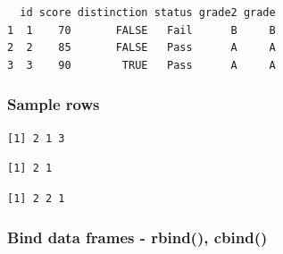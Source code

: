 \documentclass[
  letterpaper,
  DIV=11,
  numbers=noendperiod]{scrartcl}
\newenvironment{Shaded}{\begin{snugshade}}{\end{snugshade}}
\newcommand{\AttributeTok}[1]{\textcolor[rgb]{0.40,0.45,0.13}{#1}}
\newcommand{\ConstantTok}[1]{\textcolor[rgb]{0.56,0.35,0.01}{#1}}
\newcommand{\DecValTok}[1]{\textcolor[rgb]{0.68,0.00,0.00}{#1}}
\newcommand{\FunctionTok}[1]{\textcolor[rgb]{0.28,0.35,0.67}{#1}}
\newcommand{\NormalTok}[1]{\textcolor[rgb]{0.00,0.23,0.31}{#1}}
\newcommand{\SpecialCharTok}[1]{\textcolor[rgb]{0.37,0.37,0.37}{#1}}
\begin{document}
\begin{verbatim}
  id score distinction status grade2 grade
1  1    70       FALSE   Fail      B     B
2  2    85       FALSE   Pass      A     A
3  3    90        TRUE   Pass      A     A
\end{verbatim}

\subsubsection{Sample rows}\label{sample-rows}

\begin{Shaded}
\end{Shaded}

\begin{verbatim}
[1] 2 1 3
\end{verbatim}

\begin{Shaded}
\end{Shaded}

\begin{verbatim}
[1] 2 1
\end{verbatim}

\begin{Shaded}
\end{Shaded}

\begin{verbatim}
[1] 2 2 1
\end{verbatim}

\subsubsection{Bind data frames - rbind(),
cbind()}\label{bind-data-frames---rbind-cbind}
\end{document}
